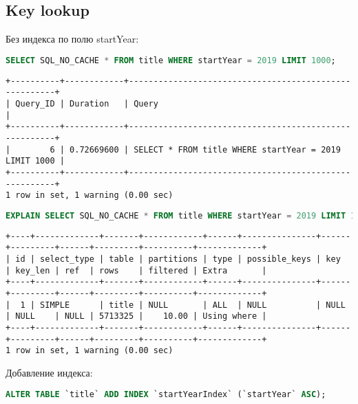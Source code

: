 \documentclass[12pt,a4paper]{article}
\begin{document}
\subsection{Key lookup}
Без индекса по полю startYear:

\begin{lstlisting}[language=SQL]
SELECT SQL_NO_CACHE * FROM title WHERE startYear = 2019 LIMIT 1000;
\end{lstlisting}
\begin{lstlisting}[basicstyle = \tiny\ttfamily, columns = fixed]
+----------+------------+-------------------------------------------------------+
| Query_ID | Duration   | Query                                                 |
+----------+------------+-------------------------------------------------------+
|        6 | 0.72669600 | SELECT * FROM title WHERE startYear = 2019 LIMIT 1000 |
+----------+------------+-------------------------------------------------------+
1 row in set, 1 warning (0.00 sec)
\end{lstlisting}
\begin{lstlisting}[language=SQL]
EXPLAIN SELECT SQL_NO_CACHE * FROM title WHERE startYear = 2019 LIMIT 1000;
\end{lstlisting}
\begin{lstlisting}[basicstyle = \tiny\ttfamily, columns = fixed]
+----+-------------+-------+------------+------+---------------+------+---------+------+---------+----------+-------------+
| id | select_type | table | partitions | type | possible_keys | key  | key_len | ref  | rows    | filtered | Extra       |
+----+-------------+-------+------------+------+---------------+------+---------+------+---------+----------+-------------+
|  1 | SIMPLE      | title | NULL       | ALL  | NULL          | NULL | NULL    | NULL | 5713325 |    10.00 | Using where |
+----+-------------+-------+------------+------+---------------+------+---------+------+---------+----------+-------------+
1 row in set, 1 warning (0.00 sec)
\end{lstlisting}

Добавление индекса:
\begin{lstlisting}[language=SQL]
ALTER TABLE `title` ADD INDEX `startYearIndex` (`startYear` ASC);
\end{lstlisting}
\end{document}
